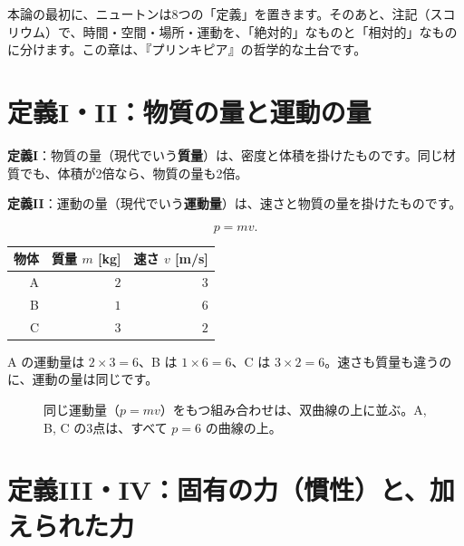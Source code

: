 \documentclass[a4paper,11pt,openany]{ltjsbook}
\begin{document}
本論の最初に、ニュートンは8つの「定義」を置きます。そのあと、注記（スコリウム）で、時間・空間・場所・運動を、「絶対的」なものと「相対的」なものに分けます。この章は、『プリンキピア』の哲学的な土台です。

\section{定義I・II：物質の量と運動の量}

\textbf{定義I}：物質の量（現代でいう\textbf{質量}）は、密度と体積を掛けたものです。同じ材質でも、体積が2倍なら、物質の量も2倍。

\textbf{定義II}：運動の量（現代でいう\textbf{運動量}）は、速さと物質の量を掛けたものです。

\[
p=mv.
\]

\begin{center}
\begin{tabular}{rrr}
\toprule
物体 & 質量 $m$ [kg] & 速さ $v$ [m/s]\\
\midrule
A & $2$ & $3$\\
B & $1$ & $6$\\
C & $3$ & $2$\\
\bottomrule
\end{tabular}
\end{center}

A の運動量は $2\times3=6$、B は $1\times6=6$、C は $3\times2=6$。速さも質量も違うのに、運動の量は同じです。

\begin{figure}[htbp]
\centering
{}
\caption{同じ運動量（$p=mv$）をもつ組み合わせは、双曲線の上に並ぶ。A, B, C の3点は、すべて $p=6$ の曲線の上。}
\end{figure}

\section{定義III・IV：固有の力（慣性）と、加えられた力}
\end{document}
